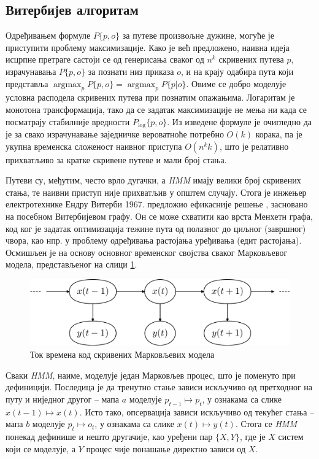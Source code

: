 \documentclass[12pt,oneside]{memoir}
\begin{document}
\begin{CJK}{UTF8}{ipxm}
\section{Витербијев алгоритам}
Одређивањем формуле $P\{p, o\}$ за путеве произвољне дужине, могуће је приступити проблему максимизације. Како је већ предложено, наивна идеја исцрпне претраге састоји се од генерисања сваког од $n^k$ скривених путева $p$, израчунавања $P\{p, o\}$ за познати низ приказа $o$, и на крају одабира пута који представља $\operatorname*{argmax}_p P\{p, o\} = \operatorname*{argmax}_p P\{p | o\}$. Овиме се добро моделује условна расподела скривених путева при познатим опажањима. Логаритам је монотона трансформација, тако да се задатак максимизације не мења ни када се посматрају стабилније вредности $P_{\log}\{p, o\}$. Из изведене формуле је очигледно да је за свако израчунавање заједничке вероватноће потребно $O(k)$ корака, па је укупна временска сложеност наивног приступа $O(n^k k)$, што је релативно прихватљиво за кратке скривене путеве и мали број стања.

Путеви су, међутим, често врло дугачки, а \textit{HMM} имају велики број скривених стања, те наивни приступ није прихватљив у општем случају. Стога је инжењер електротехнике Ендру Витерби 1967. предложио ефикасније решење \cite{viterbi1967}, засновано на посебном Витербијевом графу. Он се може схватити као врста Менхетн графа, код ког је задатак оптимизација тежине пута од полазног до циљног (завршног) чвора, као нпр. у проблему одређивања растојања уређивања (едит растојања). Осмишљен је на основу основног временског својства сваког Марковљевог модела, представљеног на слици \ref{fig:vreme}.

\begin{figure}[H]
  \centering
  \includegraphics[width=.85\textwidth]{vreme.png}
  \caption{Ток времена код скривених Марковљевих модела \cite{vreme}}
  \label{fig:vreme}
\end{figure}

Сваки \textit{HMM}, наиме, моделује један Марковљев процес, што је поменуто при дефиницији. Последица је да тренутно стање зависи искључиво од претходног на путу и ниједног другог -- мапа $a$ моделује $p_{t-1} \mapsto p_t$, у ознакама са слике $x(t-1) \mapsto x(t)$. Исто тако, опсервација зависи искључиво од текућег стања -- мапа  $b$ моделује $p_t \mapsto o_t$, у ознакама са слике $x(t) \mapsto y(t)$. Стога се \textit{HMM} понекад дефинише и нешто другачије, као уређени пар $\{X, Y\}$, где је $X$ систем који се моделује, а $Y$ процес чије понашање директно зависи од $X$.


\end{CJK}
\end{document}
